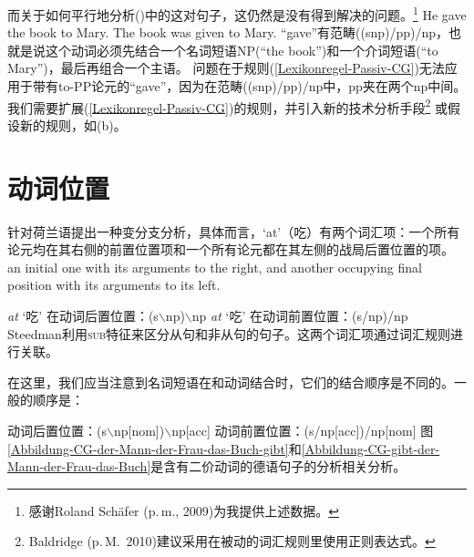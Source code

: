 \noindent
\addlines
而关于如何平行地分析()中的这对句子，这仍然是没有得到解决的问题。\footnote{
  感谢Roland Sch\"{a}fer (p.\,m., 2009)为我提供上述数据。
}
\eal
\ex He gave the book to Mary.
\ex The book was given to Mary.
\zl
``gave''有范畴((s\bs np)/pp)/np，也就是说这个动词必须先结合一个名词短语NP(``{the book}'')和一个介词短语(``{to Mary}'')，最后再组合一个主语。
问题在于规则(\ref{Lexikonregel-Passiv-CG})无法应用于带有to-PP论元的``{gave}''，因为在范畴((s\bs np)/pp)/np中，pp夹在两个np中间。
我们需要扩展(\ref{Lexikonregel-Passiv-CG})的规则，并引入新的技术分析手段\footnote{
  Baldridge (p.\,M.\ 2010)建议采用在被动的词汇规则里使用正则表达式。
 }
或假设新的规则，如(b)。

\section{动词位置}
\label{sec-Verbstellung-CG-Steedman}

\mbox{}\citet[]{Steedman2000a-u}针对荷兰语提出一种变分支分析，具体而言，`at'（吃）有两个词汇项：一个所有论元均在其右侧的前置位置项和一个所有论元都在其左侧的战局后置位置的项。
an initial one with its arguments to the right, and another occupying final position with its arguments to its left.

\eal
\ex \emph{at} `吃' 在动词后置位置：(s$\backslash$np)$\backslash$np
\ex \emph{at} `吃' 在动词前置位置：(s/np)/np
\zl
Steedman利用\textsc{sub}特征来区分从句和非从句的句子。这两个词汇项通过词汇规则进行关联。

在这里，我们应当注意到名词短语在和动词结合时，它们的结合顺序是不同的。一般的顺序是：

\eal
\label{CG-Verbbewegung}
\ex 动词后置位置：(s$\backslash$np[nom])$\backslash$np[acc]
\ex 动词前置位置：(s/np[acc])/np[nom]
\zl
图\ref{Abbildung-CG-der-Mann-der-Frau-das-Buch-gibt}和\ref{Abbildung-CG-gibt-der-Mann-der-Frau-das-Buch}是含有二价动词的德语句子的分析相关分析。

